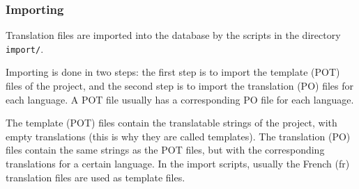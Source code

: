 \documentclass[11pt]{article}
\begin{document}
\subsubsection{Importing}
\label{sec-8.4.2}


    Translation files are imported into the database by the scripts in
    the directory \texttt{import/}.

    Importing is done in two steps: the first step is to import the
    template (POT) files of the project, and the second step is to
    import the translation (PO) files for each language.  A POT file
    usually has a corresponding PO file for each language. 

    The template (POT) files contain the translatable strings of the
    project, with empty translations (this is why they are called
    templates). The translation (PO) files contain the same strings
    as the POT files, but with the corresponding translations for a
    certain language. In the import scripts, usually the French (fr)
    translation files are used as template files.
\end{document}
